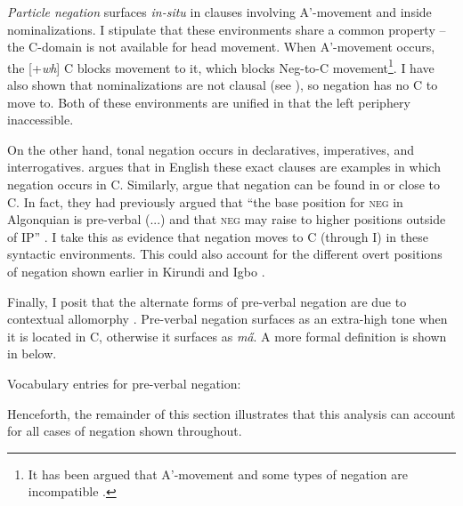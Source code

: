 \documentclass[output=paper,colorlinks,citecolor=brown,
]{langscibook}
\begin{document}

\textit{Particle negation} surfaces \textit{in-situ} in clauses involving A'-movement and inside nominalizations. I stipulate that these environments share a common property -- the C-domain is not available for head movement. When A'-movement occurs, the [+\textit{wh}] C\xhead{} blocks movement to it, which blocks Neg-to-C movement\footnote{It has been argued that A'-movement and some types of negation are incompatible \citep{roberts2018two}.}. I have also shown that nominalizations are not clausal (see ), so negation has no C to move to. Both of these environments are unified in that the left periphery inaccessible.

On the other hand, tonal negation occurs in declaratives, imperatives, and interrogatives. \citet{potsdam2013cp} argues that in English these exact clauses are examples in which negation occurs in C\xhead{}. Similarly, \citet{dchainew2002negation} argue that negation can be found in or close to C. In fact, they had previously argued that ``the base position for \textsc{neg} in Algonquian is pre-verbal (...) and that \textsc{neg} may raise to higher positions outside of IP'' \citep{dchaine2001negation}. I take this as evidence that negation moves to C\xhead{} (through I\xhead{}) in these syntactic environments. This could also account for the different overt positions of negation shown earlier in Kirundi \citep[Bantu JD.62;][]{chaperon2022} and Igbo \citep[Volta–Niger;][]{amaechiinteraction}.

Finally, I posit that the alternate forms of pre-verbal negation are due to contextual allomorphy \citep{embick2010localism, marantz2013locality}. Pre-verbal negation surfaces as an extra-high tone when it is located in C, otherwise it surfaces as \textit{m\H{a}}. A more formal definition is shown in  below.

\ea \label{ex:chaperon:vocabentry}
Vocabulary entries for pre-verbal negation: \\ 
\phonc
{}
{}
{\oneof[l]
    {\Lb{C}\phold] \\ 
   { }}
}
\z

Henceforth, the remainder of this section illustrates that this analysis can account for all cases of negation shown throughout.
\end{document}
